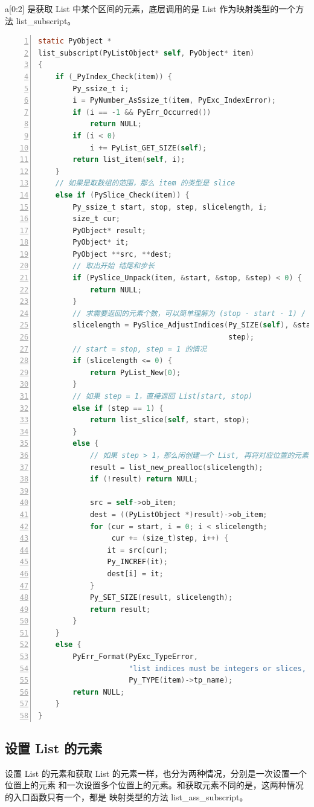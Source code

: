 a[0:2] 是获取 List 中某个区间的元素，底层调用的是 List 作为映射类型的一个方法 list\_subscript。
\begin{lstlisting}[language=C, numbers=left, numbersep=1em, numberstyle=\footnotesize , breaklines=true]
static PyObject *
list_subscript(PyListObject* self, PyObject* item)
{
    if (_PyIndex_Check(item)) {
        Py_ssize_t i;
        i = PyNumber_AsSsize_t(item, PyExc_IndexError);
        if (i == -1 && PyErr_Occurred())
            return NULL;
        if (i < 0)
            i += PyList_GET_SIZE(self);
        return list_item(self, i);
    }
    // 如果是取数组的范围，那么 item 的类型是 slice
    else if (PySlice_Check(item)) {
        Py_ssize_t start, stop, step, slicelength, i;
        size_t cur;
        PyObject* result;
        PyObject* it;
        PyObject **src, **dest;
        // 取出开始 结尾和步长
        if (PySlice_Unpack(item, &start, &stop, &step) < 0) {
            return NULL;
        }
        // 求需要返回的元素个数，可以简单理解为 (stop - start - 1) / step + 1
        slicelength = PySlice_AdjustIndices(Py_SIZE(self), &start, &stop,
                                            step);
        // start = stop, step = 1 的情况
        if (slicelength <= 0) {
            return PyList_New(0);
        }
        // 如果 step = 1，直接返回 List[start, stop)
        else if (step == 1) {
            return list_slice(self, start, stop);
        }
        else {
            // 如果 step > 1，那么闲创建一个 List, 再将对应位置的元素插入到创建的 List
            result = list_new_prealloc(slicelength);
            if (!result) return NULL;

            src = self->ob_item;
            dest = ((PyListObject *)result)->ob_item;
            for (cur = start, i = 0; i < slicelength;
                 cur += (size_t)step, i++) {
                it = src[cur];
                Py_INCREF(it);
                dest[i] = it;
            }
            Py_SET_SIZE(result, slicelength);
            return result;
        }
    }
    else {
        PyErr_Format(PyExc_TypeError,
                     "list indices must be integers or slices, not %.200s",
                     Py_TYPE(item)->tp_name);
        return NULL;
    }
}
\end{lstlisting}

\subsection{设置 List 的元素}

设置 List 的元素和获取 List 的元素一样，也分为两种情况，分别是一次设置一个位置上的元素
和一次设置多个位置上的元素。和获取元素不同的是，这两种情况的入口函数只有一个，都是
映射类型的方法 list\_ass\_subscript。

